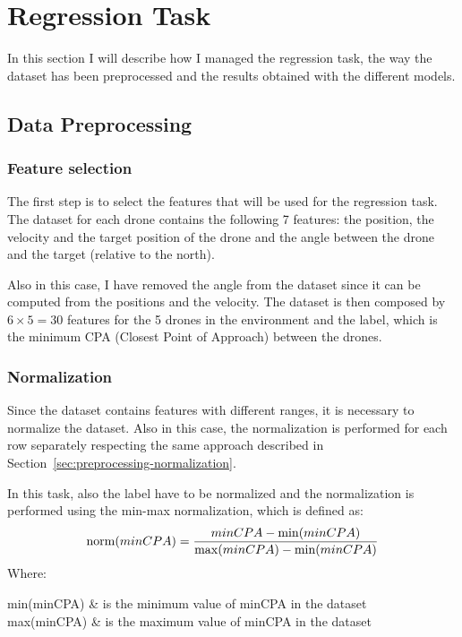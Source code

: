 \section{Regression Task} \label{sec:regression}
In this section I will describe how I managed the regression task, the way the dataset has been preprocessed and the results obtained with the different models.

\subsection{Data Preprocessing} \label{sec:preprocessing-regression}

\subsubsection{Feature selection} \label{sec:preprocessing-feature-selection-regression}
The first step is to select the features that will be used for the regression task.
The dataset for each drone contains the following 7 features: the position, the velocity and the target position of the drone and the angle between the drone and the target (relative to the north).

Also in this case, I have removed the angle from the dataset since it can be computed from the positions and the velocity.
The dataset is then composed by $6 \times 5 = 30$ features for the 5 drones in the environment and the label, which is the minimum CPA (Closest Point of Approach) between the drones.

\subsubsection{Normalization} \label{sec:preprocessing-normalization-regression}
Since the dataset contains features with different ranges, it is necessary to normalize the dataset.
Also in this case, the normalization is performed for each row separately respecting the same approach described in Section~\ref{sec:preprocessing-normalization}.

In this task, also the label have to be normalized and the normalization is performed using the min-max normalization, which is defined as:
\begin{equation}
    \label{eq:min-max-normalization}
    \operatorname{norm}(minCPA) = \frac{minCPA - \min(minCPA)}{\max(minCPA) - \min(minCPA)}
\end{equation}
Where:
\begin{conditions}
    min(minCPA) & is the minimum value of minCPA in the dataset \\
    max(minCPA) & is the maximum value of minCPA in the dataset
\end{conditions}


